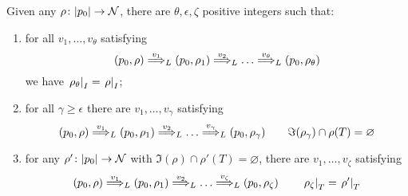 \begin{lemma} Given any $\rho \colon |p_0| \to \mathcal{N}$, there are $\theta,\epsilon,\zeta$ positive integers such that:
\label{lem:IT}
\begin{enumerate}

\item
for all $v_1,\dots,v_\theta$ satisfying
\[
	(p_0,\rho) \overset{v_1}{\Longrightarrow}_{L} (p_0,\rho_1) \overset{v_2}{\Longrightarrow}_{L} \dots \overset{v_{\theta}}{\Longrightarrow}_{L} (p_0,\rho_\theta)
\]
we have $\left. \rho_\theta \right|_{I} = \left. \rho \right|_{I}$;
\label{idI}

\item %
for all $\gamma \geq \epsilon$ there are $v_1,\dots,v_\gamma$ satisfying
\[
	(p_0,\rho) \overset{v_1}{\Longrightarrow}_{L} (p_0,\rho_1) \overset{v_2}{\Longrightarrow}_{L} \dots \overset{v_\gamma}{\Longrightarrow}_{L} (p_0,\rho_\gamma)
	\qquad 
	\Im(\rho_\gamma) \cap \rho(T) = \varnothing
\]
\label{forgetT}
\item
for any $\rho' \colon |p_0| \to \mathcal{N}$ with $\Im(\rho) \cap \rho'(T) = \varnothing$, there are $v_1,\dots,v_\zeta$ satisfying
\[
	(p_0,\rho) \overset{v_1}{\Longrightarrow}_{L} (p_0,\rho_1) \overset{v_2}{\Longrightarrow}_{L} \dots \overset{v_\zeta}{\Longrightarrow}_{L} (p_0,\rho_\zeta)	
	\qquad
	\left.\rho_\zeta\right|_{T} = \left.\rho'\right|_{T}
\]
\label{initT}
\end{enumerate}
\end{lemma}
